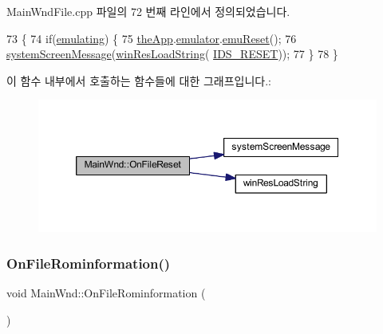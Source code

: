 Main\+Wnd\+File.\+cpp 파일의 72 번째 라인에서 정의되었습니다.


\begin{DoxyCode}
73 \{
74   \textcolor{keywordflow}{if}(\mbox{\hyperlink{_main_wnd_file_8cpp_af9cc36078b1b311753963297ae7f2a74}{emulating}}) \{
75     \mbox{\hyperlink{_v_b_a_8cpp_a8095a9d06b37a7efe3723f3218ad8fb3}{theApp}}.\mbox{\hyperlink{class_v_b_a_ab40fc008c6714c3c8670eb8a9085a4a1}{emulator}}.\mbox{\hyperlink{struct_emulated_system_ae79a9b5e75ec8b74ededbbaceac2d630}{emuReset}}();
76     \mbox{\hyperlink{system_8cpp_a0412545bfaba2004bf7a42d779ea5659}{systemScreenMessage}}(\mbox{\hyperlink{_win_res_util_8cpp_a416e85e80ab9b01376e87251c83d1a5a}{winResLoadString}}(
      \mbox{\hyperlink{resource_8h_af78bba057f49e1223bc150ef3d686321}{IDS\_RESET}}));
77   \}
78 \}
\end{DoxyCode}
이 함수 내부에서 호출하는 함수들에 대한 그래프입니다.\+:
\nopagebreak
\begin{figure}[H]
\begin{center}
\leavevmode
\includegraphics[width=350pt]{class_main_wnd_ac61e74030dfc91e1439e7b4c6c4ee59c_cgraph}
\end{center}
\end{figure}
\mbox{\label{class_main_wnd_a81e882a9db84a84f2507a63161b5bc4c}} 
\subsubsection{\texorpdfstring{On\+File\+Rominformation()}{OnFileRominformation()}}
{\footnotesize\ttfamily void Main\+Wnd\+::\+On\+File\+Rominformation (\begin{DoxyParamCaption}{ }\end{DoxyParamCaption})\hspace{0.3cm}{\ttfamily [protected]}}



